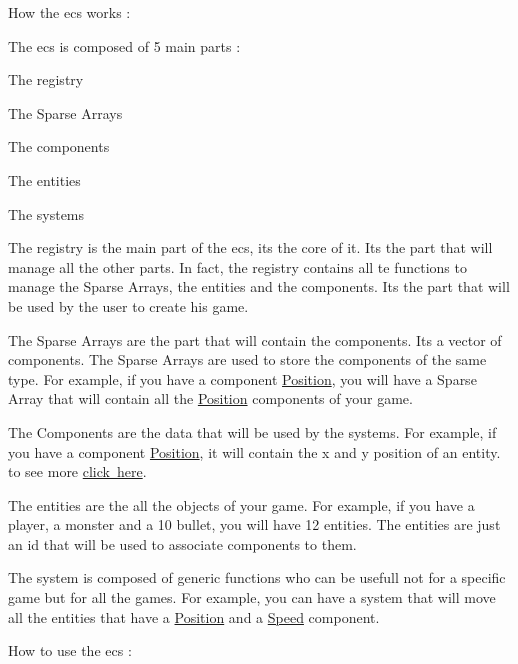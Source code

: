 How the ecs works \+:

The ecs is composed of 5 main parts \+:
\begin{DoxyItemize}
\item The registry
\item The Sparse Arrays
\item The components
\item The entities
\item The systems
\end{DoxyItemize}
\begin{DoxyEnumerate}
\item The registry is the main part of the ecs, it\textquotesingle{}s the core of it. It\textquotesingle{}s the part that will manage all the other parts. In fact, the registry contains all te functions to manage the Sparse Arrays, the entities and the components. It\textquotesingle{}s the part that will be used by the user to create his game.
\item The Sparse Arrays are the part that will contain the components. It\textquotesingle{}s a vector of components. The Sparse Arrays are used to store the components of the same type. For example, if you have a component \mbox{\hyperlink{structPosition}{Position}}, you will have a Sparse Array that will contain all the \mbox{\hyperlink{structPosition}{Position}} components of your game.
\item The Components are the data that will be used by the systems. For example, if you have a component \mbox{\hyperlink{structPosition}{Position}}, it will contain the x and y position of an entity. to see more \mbox{\hyperlink{md_ecs_components}{click here}}.
\item The entities are the all the objects of your game. For example, if you have a player, a monster and a 10 bullet, you will have 12 entities. The entities are just an id that will be used to associate components to them.
\item The system is composed of generic functions who can be usefull not for a specific game but for all the games. For example, you can have a system that will move all the entities that have a \mbox{\hyperlink{structPosition}{Position}} and a \mbox{\hyperlink{structSpeed}{Speed}} component.
\end{DoxyEnumerate}

How to use the ecs \+:


